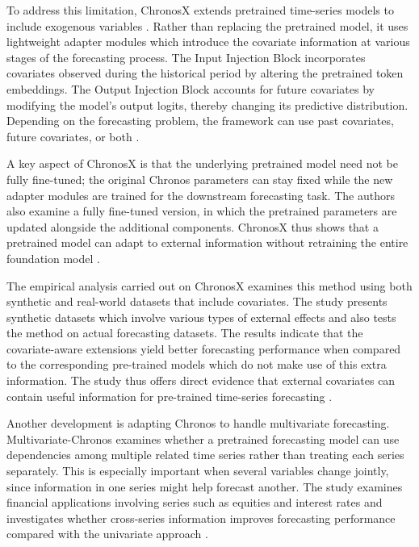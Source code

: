 \documentclass[12pt,a4paper,twoside,openany]{book}
\begin{document}
To address this limitation, ChronosX extends pretrained time-series models to include exogenous variables \cite{arango2025chronosx}. Rather than replacing the pretrained model, it uses lightweight adapter modules which introduce the covariate information at various stages of the forecasting process. The Input Injection Block incorporates covariates observed during the historical period by altering the pretrained token embeddings. The Output Injection Block accounts for future covariates by modifying the model's output logits, thereby changing its predictive distribution. Depending on the forecasting problem, the framework can use past covariates, future covariates, or both \cite{arango2025chronosx}.

A key aspect of ChronosX is that the underlying pretrained model need not be fully fine-tuned; the original Chronos parameters can stay fixed while the new adapter modules are trained for the downstream forecasting task. The authors also examine a fully fine-tuned version, in which the pretrained parameters are updated alongside the additional components. ChronosX thus shows that a pretrained model can adapt to external information without retraining the entire foundation model \cite{arango2025chronosx}.

The empirical analysis carried out on ChronosX examines this method using both synthetic and real-world datasets that include covariates. The study presents synthetic datasets which involve various types of external effects and also tests the method on actual forecasting datasets. The results indicate that the covariate-aware extensions yield better forecasting performance when compared to the corresponding pre-trained models which do not make use of this extra information. The study thus offers direct evidence that external covariates can contain useful information for pre-trained time-series forecasting \cite{arango2025chronosx}.

Another development is adapting Chronos to handle multivariate forecasting. Multivariate-Chronos examines whether a pretrained forecasting model can use dependencies among multiple related time series rather than treating each series separately. This is especially important when several variables change jointly, since information in one series might help forecast another. The study examines financial applications involving series such as equities and interest rates and investigates whether cross-series information improves forecasting performance compared with the univariate approach \cite{das2026multivariate}.
\end{document}

